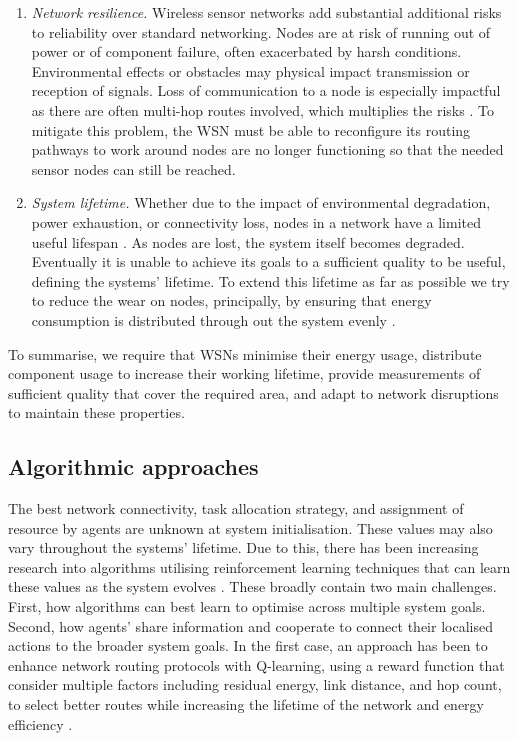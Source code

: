 \begin{enumerate}
\item \label{requirement:resilience} \textit{Network resilience.} Wireless sensor networks add substantial additional risks to reliability over standard networking. Nodes are at risk of running out of power or of component failure, often exacerbated by harsh conditions. Environmental effects or obstacles may physical impact transmission or reception of signals. Loss of communication to a node is especially impactful as there are often multi-hop routes involved, which multiplies the risks \citep{Paradis2007}. To mitigate this problem, the WSN must be able to reconfigure its routing pathways to work around nodes are no longer functioning so that the needed sensor nodes can still be reached.

\item \label{requirement:lifetime} \textit{System lifetime.} Whether due to the impact of environmental degradation, power exhaustion, or connectivity loss, nodes in a network have a limited useful lifespan \citep{Mak2009}. As nodes are lost, the system itself becomes degraded. Eventually it is unable to achieve its goals to a sufficient quality to be useful, defining the systems' lifetime. To extend this lifetime as far as possible we try to reduce the wear on nodes, principally, by ensuring that energy consumption is distributed through out the system evenly \citep{BABAYO20171176, Engmann2018}.
\end{enumerate}
To summarise, we require that WSNs minimise their energy usage, distribute component usage to increase their working lifetime, provide measurements of sufficient quality that cover the required area, and adapt to network disruptions to maintain these properties.

\subsection{Algorithmic approaches}
The best network connectivity, task allocation strategy, and assignment of resource by agents are unknown at system initialisation. These values may also vary throughout the systems' lifetime. Due to this, there has been increasing research into algorithms utilising reinforcement learning techniques that can learn these values as the system evolves \citep{Al-Rawi2015}. These broadly contain two main challenges. First, how algorithms can best learn to optimise across multiple system goals. Second, how agents' share information and cooperate to connect their localised actions to the broader system goals. In the first case, an approach has been to enhance network routing protocols with Q-learning, using a reward function that consider multiple factors including residual energy, link distance, and hop count, to select better routes while increasing the lifetime of the network and energy efficiency \citep{Guo2019}. 

